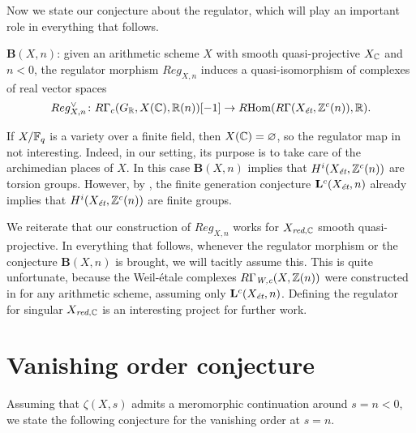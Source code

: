 \documentclass{article}
\numberwithin{equation}{section}
\begin{document}
Now we state our conjecture about the regulator, which will play an important
role in everything that follows.

\begin{conjecture}
  $\mathbf{B} (X,n)$: given an arithmetic scheme $X$ with smooth
  quasi-projective $X_\CC$ and $n < 0$, the regulator morphism $Reg_{X,n}$
  induces a quasi-isomorphism of complexes of real vector spaces
  \[ Reg_{X,n}^\vee\colon R\Gamma_c (G_\RR, X (\CC), \RR (n)) [-1] \to
    \RHom (R\Gamma (X_\et, \ZZ^c (n)), \RR). \]
\end{conjecture}

\begin{remark}
  If $X/\FF_q$ is a variety over a finite field, then $X (\CC) = \emptyset$,
  so the regulator map in not interesting. Indeed, in our setting, its purpose
  is to take care of the archimedian places of $X$. In this case
  $\mathbf{B} (X,n)$ implies that $H^i (X_\et, \ZZ^c (n))$ are torsion groups.
  However, by \cite[Proposition~4.2]{Beshenov-Weil-etale-1}, the finite
  generation conjecture $\mathbf{L}^c (X_\et, n)$ already implies that
  $H^i (X_\et, \ZZ^c (n))$ are finite groups.
\end{remark}

\begin{remark}
  \label{rmk:regulator-is-defined-for-XC-smooth-quasi-proj}
  We reiterate that our construction of $Reg_{X,n}$ works for $X_{\red,\CC}$
  smooth quasi-projective. In everything that follows, whenever the regulator
  morphism or the conjecture $\mathbf{B} (X,n)$ is brought, we will tacitly
  assume this.  This is quite unfortunate, because the Weil-étale complexes
  $R\Gamma_\Wc (X, \ZZ(n))$ were constructed in \cite{Beshenov-Weil-etale-1} for
  any arithmetic scheme, assuming only $\mathbf{L}^c (X_\et,n)$. Defining the
  regulator for singular $X_{\red,\CC}$ is an interesting project for further
  work.
\end{remark}


\section{Vanishing order conjecture}
\label{sec:vanishing-order-conjecture}

Assuming that $\zeta (X,s)$ admits a meromorphic continuation around
$s = n < 0$, we state the following conjecture for the vanishing order at
$s = n$.
\end{document}
